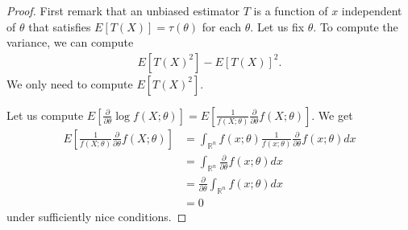 \documentclass[11pt]{amsart}
\theoremstyle{definition}
\numberwithin{equation}{section}
\begin{document}
\begin{proof}
    First remark that an unbiased estimator $T$ is a function of $x$ independent of $\theta$ that satisfies $E[T(X)]=\tau(\theta)$ for each $\theta$. Let us fix $\theta$. To compute the variance, we can compute
    \begin{align*}
        E[T(X)^2]-E[T(X)]^2.
    \end{align*}
    We only need to compute $E[T(X)^2]$.

    
    Let us compute $E[\frac{\partial}{\partial\theta}\log f(X;\theta)]=E[\frac{1}{f(X;\theta)}\frac{\partial}{\partial\theta}f(X;\theta)]$. We get
    \begin{align*}
        E[\frac{1}{f(X;\theta)}\frac{\partial}{\partial\theta}f(X;\theta)]&=\int_{\mathbb R^n}f(x;\theta)\frac{1}{f(x;\theta)}\frac{\partial}{\partial\theta}f(x;\theta)dx\\
        &=\int_{\mathbb R^n}\frac{\partial}{\partial\theta}f(x;\theta)dx\\
        &=\frac{\partial}{\partial\theta}\int_{\mathbb R^n}f(x;\theta)dx\\
        &=0
    \end{align*}
    under sufficiently nice conditions.


\end{proof}
\end{document}

